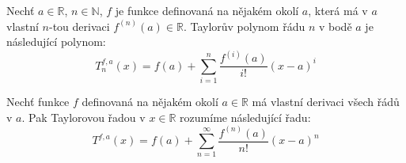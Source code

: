\begin{definition}
	Nechť $a \in \mathbb{R}$, $n \in \mathbb{N}$, $f$ je funkce definovaná na nějakém okolí $a$, která má v $a$ vlastní $n$-tou derivaci $f^{(n)}(a) \in \mathbb{R}$.
	Taylorův polynom řádu $n$ v bodě $a$ je následující polynom:
	$$T_n^{f,a}(x) = f(a) + \sum_{i = 1}^{n} \frac{f^{(i)}(a)}{i!} (x - a)^{i}$$
	\label{def:tayloruv_polynom}
\end{definition}

\begin{definition}
	Nechť funkce $f$ definovaná na nějakém okolí $a \in \mathbb{R}$ má vlastní derivaci všech řádů v $a$.
	Pak Taylorovou řadou v $x \in \mathbb{R}$ rozumíme následující řadu:
	$$T^{f,a}(x) = f(a) + \sum_{n = 1}^{\infty} \frac{f^{(n)}(a)}{n!} (x - a)^{n}$$
	\label{def:taylorova_rada}
\end{definition}

